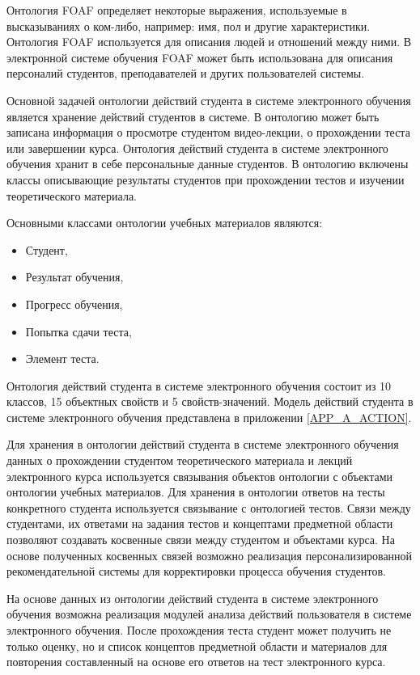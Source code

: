 Онтология FOAF определяет некоторые выражения, используемые в высказываниях о ком-либо, например: имя, пол и другие характеристики. Онтология FOAF используется для описания людей и отношений между ними. В электронной системе обучения FOAF может быть использована для описания персоналий студентов, преподавателей и других пользователей системы.

Основной задачей онтологии действий студента в системе электронного обучения является хранение действий студентов в системе. В онтологию может быть записана информация о просмотре студентом видео-лекции, о прохождении теста или завершении курса. Онтология действий студента в системе электронного обучения хранит в себе персональные данные студентов. В онтологию включены классы описывающие результаты студентов при прохождении тестов и изучении теоретического материала.

Основными классами онтологии учебных материалов являются:

\begin{itemize}
\item Студент,
\item Результат обучения,
\item Прогресс обучения,
\item Попытка сдачи теста,
\item Элемент теста.
\end{itemize}

Онтология действий студента в системе электронного обучения состоит из 10 классов, 15 объектных свойств и 5 свойств-значений. Модель действий студента в системе электронного обучения представлена в приложении \ref{APP_A_ACTION}.

Для хранения в онтологии действий студента в системе электронного обучения данных о прохождении студентом теоретического материала и лекций электронного курса используется связывания объектов онтологии с объектами онтологии учебных материалов. Для хранения в онтологии  ответов на тесты конкретного студента используется связывание с онтологией тестов. Связи между студентами, их ответами на задания тестов и  концептами предметной области позволяют создавать косвенные связи между студентом и объектами курса. На основе полученных косвенных связей возможно реализация персонализированной рекомендательной системы для корректировки процесса обучения студентов. 

На основе данных из онтологии действий студента в системе электронного обучения возможна реализация модулей анализа действий пользователя в системе электронного обучения. После прохождения теста студент может получить не только оценку, но и список концептов предметной области и материалов для повторения составленный на основе его ответов на тест электронного курса.



